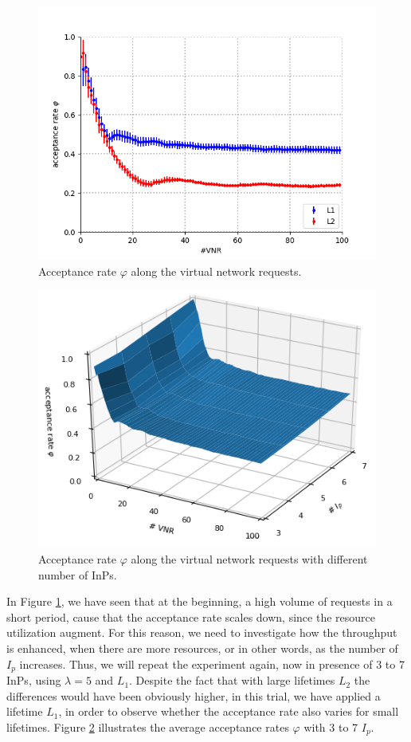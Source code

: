 \begin{figure}[bth]
	\centering
	\includegraphics[scale=0.65]{gfx/ev_acceptance_rate.png}    
  	\caption{Acceptance rate $\varphi$ along the virtual network requests.}
  	\label{fig:acceptance_rate}
\end{figure}

\begin{figure}[h!]
	\centering
	\includegraphics[scale=0.95]{gfx/ev_acceptance_rate3D.png}    
  	\caption{Acceptance rate $\varphi$ along the virtual network requests with different number of InPs.}
  	\label{fig:acceptance_rate_3D}
\end{figure}

In Figure \ref{fig:acceptance_rate}, we have seen that at the beginning, a high volume of requests in a short period, cause that the acceptance rate scales down, since the resource utilization augment. For this reason, we need to investigate how the throughput is enhanced, when there are more resources, or in other words, as the number of $I_p$ increases. Thus, we will repeat the experiment again, now in presence of 3 to 7 InPs, using $\lambda = 5$ and $L_1$. Despite the fact that with large lifetimes $L_2$ the differences would have been obviously higher, in this trial, we have applied a lifetime $L_1$, in order to observe whether the acceptance rate also varies for small lifetimes. Figure \ref{fig:acceptance_rate_3D} illustrates the average acceptance rates $\varphi$ with 3 to 7 $I_p$.

